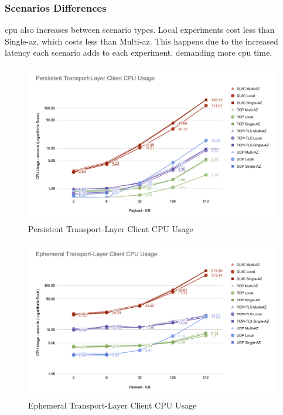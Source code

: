 \subsubsection*{Scenarios Differences}

\gls{cpu} also increases between scenario types. Local experiments cost less than Single-\gls{az}, which costs less than Multi-\gls{az}. This happens due to the increased latency each scenario adds to each experiment, demanding more \gls{cpu} time.

\clearpage

\begin{figure}[h!]
    \centering
    \includegraphics[width=\linewidth]{figures/charts/Persistent Transport-Layer Client CPU Usage.png}
    \caption{Persistent Transport-Layer Client CPU Usage}
    \label{fig:persistent_client_transport_cpu}
\end{figure}

\begin{figure}[h!]
    \centering
    \includegraphics[width=\linewidth]{figures/charts/Ephemeral Transport-Layer Client CPU Usage.png}
    \caption{Ephemeral Transport-Layer Client CPU Usage}
    \label{fig:ephemeral_client_transport_cpu}
\end{figure}

